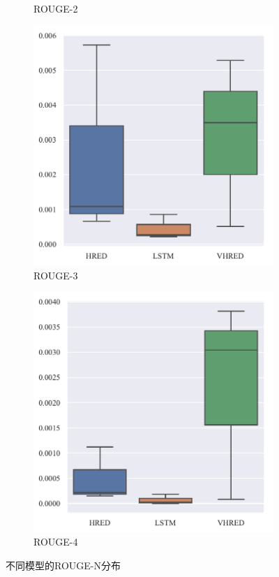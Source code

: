 \begin{figure}[H]
\begin{subfigure}{0.5\linewidth}
        \caption{ROUGE-2}
    \end{subfigure}
    \begin{subfigure}{0.5\linewidth}
        \centering
        \includegraphics[width=\linewidth]{figure/boxplot/model/rouge_3/plot.pdf}
        \caption{ROUGE-3}
    \end{subfigure}%
    \begin{subfigure}{0.5\linewidth}
        \centering
        \includegraphics[width=\linewidth]{figure/boxplot/model/rouge_4/plot.pdf}
        \caption{ROUGE-4}
    \end{subfigure}
    \centering
    \caption{不同模型的ROUGE-N分布}
    \label{fig:ROUGE_N_model}
\end{figure}
